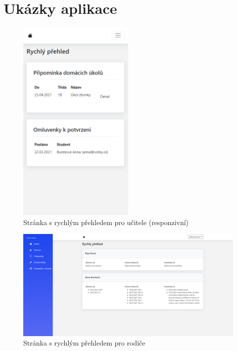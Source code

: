 \chapter{Ukázky aplikace}

\begin{figure}[h]
	\centering
	\includegraphics[width=0.5\textwidth]{images/app_samples/ucitel-rychly-prehled-responzivni.png}
	\caption{Stránka s rychlým přehledem pro učitele (responzivní)}
	\label{ucitel-rychly-prehled-responzivni}
\end{figure}
\clearpage

\begin{figure}
	\centering
	\includegraphics[width=\textwidth]{images/app_samples/rodic-rychly-prehled.png}
	\caption{Stránka s rychlým přehledem pro rodiče}
	\label{rodic-rychly-prehled}
\end{figure}
\clearpage

